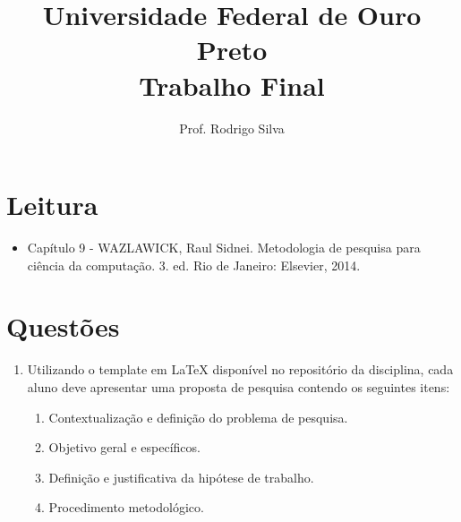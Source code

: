 \documentclass{article}
\title{\vspace{-2 cm}Universidade Federal de Ouro Preto \\ Trabalho Final}
\author{Prof. Rodrigo Silva}
\date{}
\begin{document}
\maketitle

\section{Leitura}

\begin{itemize}
    \item Capítulo 9 - WAZLAWICK, Raul Sidnei. Metodologia de pesquisa para ciência da computação. 3. ed. Rio de Janeiro: Elsevier, 2014.
\end{itemize}

\section{Questões}

\begin{enumerate}
\item Utilizando o template em LaTeX disponível no repositório da disciplina, cada aluno deve apresentar uma proposta de pesquisa contendo os seguintes itens:

\begin{enumerate}
    \item Contextualização e definição do problema de pesquisa.
    \item Objetivo geral e específicos.
    \item Definição e justificativa da hipótese de trabalho.
    \item Procedimento metodológico.
\end{enumerate} 

\end{enumerate}


%
%
\end{document}
